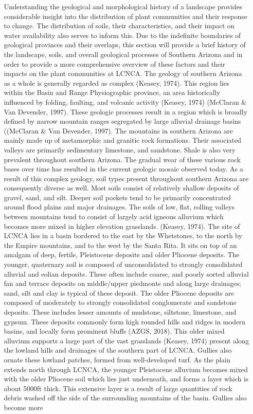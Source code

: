 \documentclass{article}
\begin{document}
Understanding the geological and morphological history of a landscape provides considerable insight into the distribution of plant communities and their response to change. The distribution of soils, their characteristics, and their impact on water availability also serves to inform this. Due to the indefinite boundaries of geological provinces and their overlaps, this section will provide a brief history of the landscape, soils, and overall geological processes of Southern Arizona and in order to provide a more comprehensive overview of these factors and their impacts on the plant communities at LCNCA. The geology of southern Arizona as a whole is generally regarded as complex (Keasey, 1974). This region lies within the Basin and Range Physiographic province, an area historically influenced by folding, faulting, and volcanic activity (Keasey, 1974) (McClaran & Van Devender, 1997). These geologic processes result in a region which is broadly defined by narrow mountain ranges segregated by large alluvial drainage basins ((McClaran & Van Devender, 1997). The mountains in southern Arizona are mainly made up of metamorphic and granitic rock formations. Their associated valleys are primarily sedimentary limestone, and sandstone. Shale is also very prevalent throughout southern Arizona. The gradual wear of these various rock bases over time has resulted in the current geologic mosaic observed today. As a result of this complex geology, soil types present throughout southern Arizona are consequently diverse as well. Most soils consist of relatively shallow deposits of gravel, sand, and silt. Deeper soil pockets tend to be primarily concentrated around flood plains and major drainages. The soils of low, flat, rolling valleys between mountains tend to consist of largely acid igneous alluvium which becomes more mixed in higher elevation grasslands. (Keasey, 1974). The site of LCNCA lies in a basin bordered to the east by the Whetstones, to the north by the Empire mountains, and to the west by the Santa Rita. It sits on top of an amalgam of deep, fertile, Pleistocene deposits and older Pliocene deposits. The younger, quaternary soil is composed of unconsolidated to strongly consolidated alluvial and eolian deposits. These often include coarse, and poorly sorted alluvial fan and terrace deposits on middle/upper piedmonts and along large drainages; sand, silt and clay is typical of these deposit. The older Pliocene deposits are composed of moderately to strongly consolidated conglomerate and sandstone deposits. These includes lesser amounts of mudstone, siltstone, limestone, and gypsum. These deposits commonly form high rounded hills and ridges in modern basins, and locally form prominent bluffs (AZGS, 2018). This older mixed alluvium supports a large part of the vast grasslands (Keasey, 1974) present along the lowland hills and drainages of the southern part of LCNCA. Gullies also ornate these lowland patches, formed from well-developed turf. As the plain extends north through LCNCA, the younger Pleistocene alluvium becomes mixed with the older Pliocene soil which lies just underneath, and forms a layer which is about 5000ft thick. This extensive layer is a result of large quantities of rock debris washed off the side of the surrounding mountains of the basin. Gullies also become more 
\end{document}

